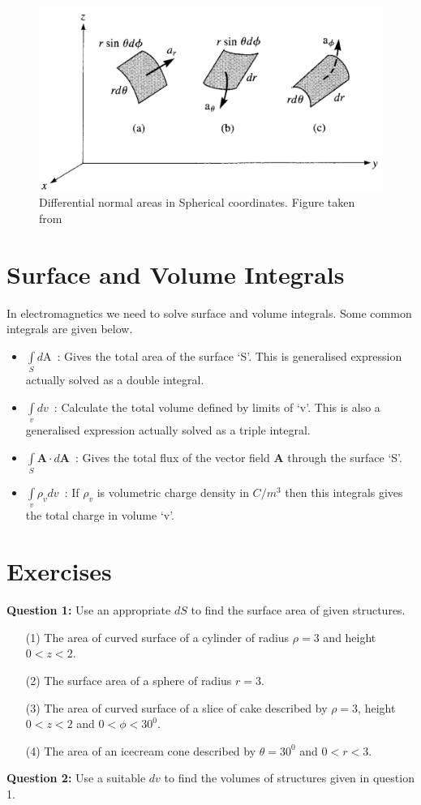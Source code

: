 \documentclass[12pt,a4paper]{article}
\begin{document}
\begin{figure}[h]
\centering
\includegraphics[scale=0.3]{Figure3-6S.png}
\caption{Differential normal areas in Spherical coordinates. Figure taken from~\cite[Figure 3.6, page 57]{Sadiku}}
\label{Spherical-differential-area}
\end{figure}
\section{Surface and Volume Integrals}
In electromagnetics we need to solve surface and volume integrals. Some common integrals are given below.
\begin{itemize}
\item $\int\limits_{S} d\mathrm{A}$~: Gives the total area of the surface `S'. This is generalised expression actually solved as a double integral.
\item $\int\limits_{v} dv$~: Calculate the total volume defined by limits of `v'. This is also a generalised expression actually solved as a triple integral.
\item $\int\limits_{S}\textbf{A}\cdot d\textbf{A}$~: Gives the total flux of the vector field \textbf{A} through the surface `S'.
\item $\int\limits_{v}\rho_v dv$~: If $\rho_v$ is volumetric charge density in $C/m^3$ then this integrals gives the total charge in volume `v'.
\end{itemize}
\section{Exercises}
\noindent\textbf{Question 1:} Use an appropriate $dS$ to find the surface area of given structures.
\begin{itemize}
\item[(1)] The area of curved surface of a cylinder of radius $\rho=3$ and height $0<z<2$.
\item[(2)] The surface area of a sphere of radius $r=3$.
\item[(3)] The area of curved surface of a slice of cake described by $\rho=3$, height $0<z<2$ and $0<\phi<30^0$.
\item[(4)] The area of an icecream cone described by $\theta=30^0$ and $0<r<3$.
\end{itemize}
\noindent\textbf{Question 2:} Use a suitable $dv$ to find the volumes of structures given in question 1.\\[0.2cm]


\end{document}
